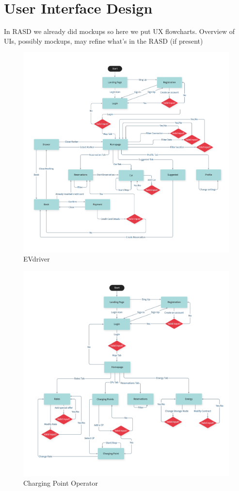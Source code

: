 \section{User Interface Design}
In RASD we already did mockups so here we put UX flowcharts.
Overview of UIs, possibly mockups, may refine what’s in the RASD (if present)

\begin{figure}[H]
    \centering
    \includegraphics[scale=0.41]{src/UIDesign/User.pdf}
    \caption{EVdriver}
\end{figure} \vspace{1cm}

\begin{figure}[H]
    \centering
    \includegraphics[scale=0.41]{src/UIDesign/Cpo.pdf}
    \caption{Charging Point Operator}
\end{figure} \vspace{1cm}